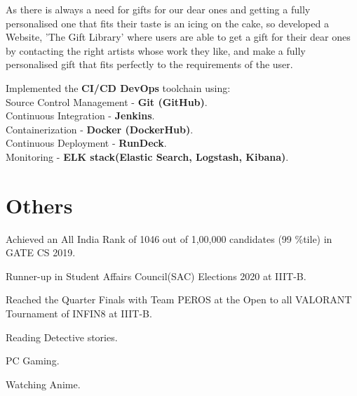\documentclass[]{deedy-resume-openfont}
\begin{document}
\begin{minipage}[t]{0.66\textwidth}
\begin{tightemize}
\item As there is always a need for gifts for our dear ones and getting a fully personalised one that fits their taste is an icing on the cake, so developed a Website, 'The Gift Library' where users are able to get a gift for their dear ones by contacting the right artists whose work they like, and make a fully personalised gift that fits perfectly to the requirements of the user.
\item Implemented the \textbf{CI/CD DevOps} toolchain using: \\
Source Control Management - \textbf{Git (GitHub)}.\\
Continuous Integration - \textbf{Jenkins}.\\
Containerization - \textbf{Docker (DockerHub)}.\\
Continuous Deployment - \textbf{RunDeck}.\\
Monitoring - \textbf{ELK stack(Elastic Search, Logstash, Kibana)}.
\end{tightemize}
\sectionsep


\section{Others} 

\begin{tightemize}
\item Achieved an All India Rank of 1046 out of 1,00,000 candidates (99 \%tile) in 
GATE CS 2019.
\item Runner-up in Student Affairs Council(SAC) Elections 2020 at IIIT-B.
\item Reached the Quarter Finals with Team PEROS at the Open to all VALORANT Tournament of INFIN8 at IIIT-B.
\end{tightemize}

\begin{tightemize}
\item Reading Detective stories.
\item PC Gaming.
\item Watching Anime.
\end{tightemize}

\end{minipage} 
\end{document}
